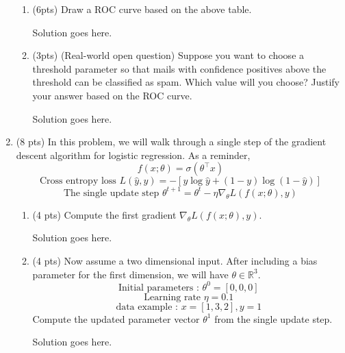 \documentclass[a4paper]{article}
\theoremstyle{definition}
\newenvironment{soln}{
    \leavevmode\color{blue}\ignorespaces
}{}
\begin{document}
\begin{enumerate}
\begin{enumerate}
	\item (6pts) Draw a ROC curve based on the above table.
	
	\begin{soln}  Solution goes here. \end{soln}
	
	\item (3pts) (Real-world open question) Suppose you want to choose a threshold parameter so that mails with confidence positives above the threshold can be classified as spam. Which value will you choose? Justify your answer based on the ROC curve.
	
	\begin{soln}  Solution goes here. \end{soln}
\end{enumerate}

\item (8 pts) In this problem, we will walk through a single step of the gradient descent algorithm for logistic regression. As a reminder,
$$f(x;\theta) = \sigma(\theta^\top x)$$
$$\text{Cross entropy loss } L(\hat{y}, y) = -[y \log  \hat{y} + (1-y)\log(1-\hat{y})]$$
$$\text{The single update step } \theta^{t+1} = \theta^{t} - \eta \nabla_{\theta} L(f(x;\theta), y) $$



\begin{enumerate}
	\item (4 pts) Compute the first gradient $\nabla_{\theta} L(f(x;\theta), y)$.
	
	\begin{soln}  Solution goes here. \end{soln}
	
	\item (4 pts)
 Now assume a two dimensional input. After including a bias parameter for the first dimension, we will have $\theta\in\mathbb{R}^3$.
$$ \text{Initial parameters : }  \theta^{0}=[0, 0, 0]$$
$$ \text{Learning rate }\eta=0.1$$
$$ \text{data example : } x=[1, 3, 2], y=1$$
Compute the updated parameter vector $\theta^{1}$ from the single update step.
	
	\begin{soln}  Solution goes here. \end{soln}
\end{enumerate}
\end{enumerate}
\end{document}
